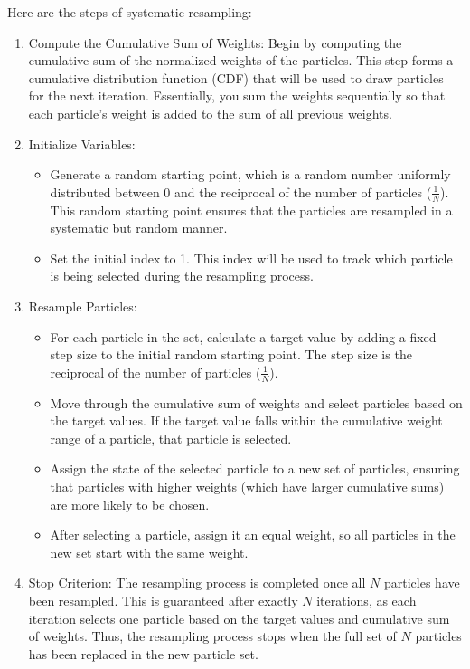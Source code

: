Here are the steps of systematic resampling:
\begin{enumerate}
    \item Compute the Cumulative Sum of Weights: Begin by computing the cumulative sum of the normalized weights of the particles. This step forms a cumulative distribution function (CDF) that will be used to draw particles for the next iteration. Essentially, you sum the weights sequentially so that each particle’s weight is added to the sum of all previous weights.
    \item Initialize Variables:
    \begin{itemize}
        \item Generate a random starting point, which is a random number uniformly distributed between 0 and the reciprocal of the number of particles ($\frac{1}{N}$). This random starting point ensures that the particles are resampled in a systematic but random manner.
        \item Set the initial index to 1. This index will be used to track which particle is being selected during the resampling process.
    \end{itemize}
    \item Resample Particles:
    \begin{itemize}
        \item For each particle in the set, calculate a target value by adding a fixed step size to the initial random starting point. The step size is the reciprocal of the number of particles ($\frac{1}{N}$).
        \item Move through the cumulative sum of weights and select particles based on the target values. If the target value falls within the cumulative weight range of a particle, that particle is selected.
        \item Assign the state of the selected particle to a new set of particles, ensuring that particles with higher weights (which have larger cumulative sums) are more likely to be chosen.
        \item After selecting a particle, assign it an equal weight, so all particles in the new set start with the same weight.
    \end{itemize}
    \item Stop Criterion: The resampling process is completed once all $N$ particles have been resampled. This is guaranteed after exactly $N$ iterations, as each iteration selects one particle based on the target values and cumulative sum of weights. Thus, the resampling process stops when the full set of $N$ particles has been replaced in the new particle set.
\end{enumerate}



